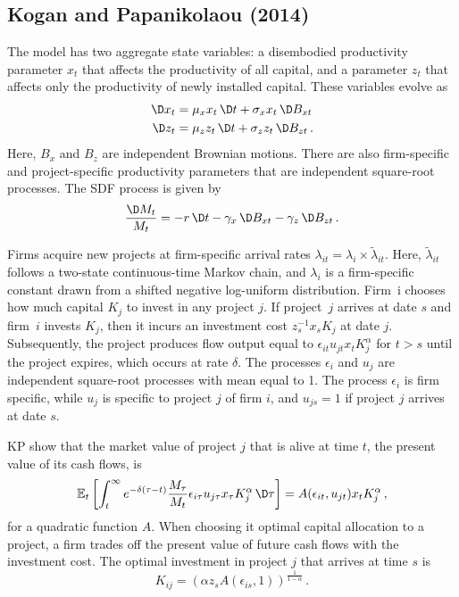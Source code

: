 \begin{appendices}
\section{Kogan and Papanikolaou (2014)}

The model has two aggregate state variables: a disembodied productivity parameter $x_t$ that affects the productivity of all capital, and a parameter $z_t$ that affects only the productivity of newly installed capital. These variables evolve as
\begin{align*}
\D x_t &= \mu_x x_t \,\D t + \sigma_x x_t \,\D B_{xt} \\
\D z_t &= \mu_z z_t \,\D t + \sigma_z z_t \,\D B_{zt}\,.
\end{align*}
Here, $B_x$ and $B_z$ are independent Brownian motions.  There are also firm-specific and project-specific productivity parameters that are independent square-root processes.  The SDF process is given by 
\[
\frac{\D M_t}{M_t} = -r \,\D t - \gamma_x \,\D B_{xt} - \gamma_z \,\D B_{zt}\,.
\]

Firms acquire new projects at firm-specific arrival rates $\lambda_{it} = \lambda_i \times \tilde \lambda_{it}.$ Here, $\tilde \lambda_{it}$ follows a two-state continuous-time Markov chain, and $\lambda_i$ is a firm-specific constant drawn from a shifted negative log-uniform distribution. Firm~i chooses how much capital $K_{j}$ to invest in any project $j$.  If project~$j$ arrives at date $s$ and firm~$i$ invests $K_{j}$, then it incurs an investment cost $z_s^{-1} x_s K_{j}$ at date $j$.  Subsequently, the project produces flow output equal to $\epsilon_{it} u_{jt} x_t K_j^{\alpha}$ for $t>s$ until the project expires, which occurs at rate $\delta.$  The processes $\epsilon_{i}$ and $u_{j}$ are independent square-root processes with mean equal to 1. The process  $\epsilon_{i}$ is firm specific, while $u_{j}$ is specific to project $j$ of firm $i$, and $u_{js}=1$ if project $j$ arrives at date $s$.

KP show that the market value of project $j$ that is alive at time $t$, the present value of its cash flows, is 
\[
\mathbb{E}_t \left[\int_{t}^{\infty} e^{- \delta(\tau - t)} \frac{M_\tau}{M_t} \epsilon_{i\tau} u_{j\tau} x_\tau K_j^{\alpha} \,\D \tau \right] = A(\epsilon_{it}, u_{jt}) x_t K_j^{\alpha}\,,
\]
for a quadratic function $A$. When choosing it optimal capital allocation to a project, a firm trades off the present value of future cash flows with the investment cost. The optimal investment in project $j$ that arrives at time $s$ is 
\[
K_{ij} = (\alpha z_s A(\epsilon_{is}, 1))^{\frac{1}{1 - \alpha}}\,.
\]


\end{appendices}
